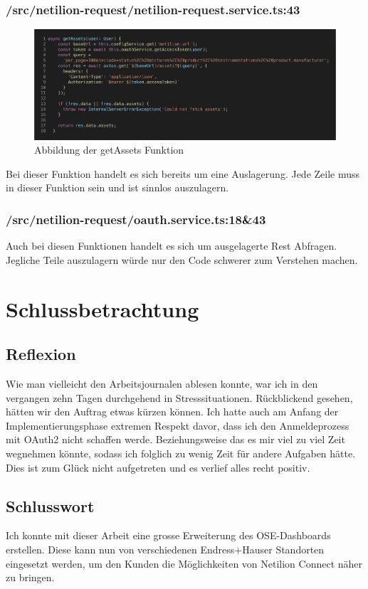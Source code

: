 \subsubsection{/src/netilion-request/netilion-request.service.ts:43}
\begin{figure}[H]
  \centering
  \includegraphics[width=.95\linewidth]{./images/verstoss-3.png}
  \caption[{Abbildung der getAssets Funktion}]{Abbildung der getAssets Funktion}
\end{figure}
Bei dieser Funktion handelt es sich bereits um eine Auslagerung. Jede Zeile muss in dieser Funktion sein und ist sinnlos auszulagern.
\subsubsection{/src/netilion-request/oauth.service.ts:18\&43}
Auch bei diesen Funktionen handelt es sich um ausgelagerte Rest Abfragen. Jegliche Teile auszulagern würde nur den Code schwerer zum Verstehen machen.
\section{Schlussbetrachtung}
\subsection{Reflexion}
Wie man vielleicht den Arbeitsjournalen ablesen konnte, war ich in den vergangen zehn Tagen durchgehend in Stresssituationen. Rückblickend gesehen, hätten wir den Auftrag etwas kürzen können. Ich hatte auch am Anfang der Implementierungsphase extremen Respekt davor, dass ich den Anmeldeprozess mit OAuth2 nicht schaffen werde. Beziehungsweise das es mir viel zu viel Zeit wegnehmen könnte, sodass ich folglich zu wenig Zeit für andere Aufgaben hätte. Dies ist zum Glück nicht aufgetreten und es verlief alles recht positiv.
\subsection{Schlusswort}
Ich konnte mit dieser Arbeit eine grosse Erweiterung des OSE-Dashboards erstellen. Diese kann nun von verschiedenen Endress+Hauser Standorten eingesetzt werden, um den Kunden die Möglichkeiten von Netilion Connect näher zu bringen.
